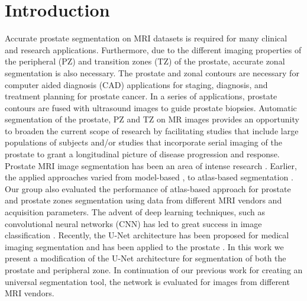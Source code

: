 \section{Introduction}
\label{sec:intro}
Accurate prostate segmentation on MRI datasets is required for many clinical and research 
applications. Furthermore, due to the different imaging properties of the peripheral (PZ) 
and transition zones (TZ) of the prostate, accurate zonal segmentation is also necessary. 
The prostate and zonal contours are necessary for computer aided diagnosis (CAD)
applications for staging, diagnosis, and treatment planning for prostate cancer. In 
a series of applications, prostate contours are fused with ultrasound images to
guide prostate biopsies. Automatic segmentation of the prostate, PZ and TZ on MR 
images provides an opportunity to broaden the current scope of research by facilitating 
studies that include large populations of subjects and/or studies that incorporate 
serial imaging of the prostate to grant a longitudinal picture of disease 
progression and response.  
Prostate MRI image segmentation has been an area of intense research \cite{litjens2014evaluation}. Earlier, the 
applied approaches varied from model-based \cite{chowdhury2012concurrent,toth2012multifeature},
 to atlas-based segmentation
\cite{4_klein2008automatic,5_cheng2014atlas,7_tian2015fully, 8_korsager2015use, 9_chilali2016gland}.
 Our group also evaluated the performance of atlas-based approach for prostate and prostate zones 
segmentation using data from different MRI vendors and acquisition parameters\cite{10_padgett2018towards}. The advent 
of deep learning techniques, such as convolutional neural networks (CNN) has led to great success 
in image classification \cite{11_krizhevsky2012imagenet,12_simonyan2011immediate}. Recently, 
the U-Net architecture has been proposed \cite{13_ronneberger2015u} for medical imaging 
segmentation and has been applied to the prostate \cite{14_meyer2018automatic}.
In this work we present a modification of the U-Net architecture for segmentation of both 
the prostate and peripheral zone. In continuation of our previous work for creating an 
universal segmentation tool, the network is evaluated for images from different MRI vendors.  
